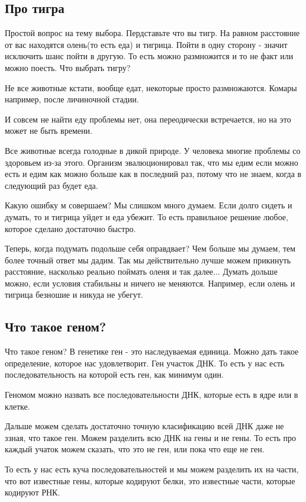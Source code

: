 ﻿\subsection{Про тигра}
Простой вопрос на тему выбора. 
Пердставьте что вы тигр. На равном расстояние от 
вас находятся олень(то есть еда) и тигрица. Пойти в одну 
сторону - значит исключить шанс пойти в другую. То есть 
можно размножится и то не факт или можно поесть. Что 
выбрать тигру? 

Не все животные кстати, вообще едат, некоторые просто размножаются. 
Комары например, после личиночной стадии. 

И совсем не найти еду проблемы нет, она переодически встречается, 
но на это может не быть времени. 

Все животные всегда голодные в дикой природе. У человека многие 
проблемы со здоровьем из-за этого. Организм эвалюционировал так, 
что мы едим если можно есть и едим как можно больше как в 
последний раз, потому что не знаем, когда в следующий раз будет еда. 

Какую ошибку м совершаем? Мы слишком много думаем. Если долго 
сидеть и думать, то и тигрица уйдет и еда убежит. То есть 
правильное решение любое, которое сделано достаточно быстро. 

Теперь, когда подумать подольше себя оправдвает? 
Чем больше мы думаем, тем более точный ответ мы дадим. 
Так мы действительно лучше можем прикинуть расстояние, 
насколько реально поймать оленя и так далее... Думать 
дольше можно, если условия стабильны и ничего не меняются. 
Например, если олень и тигрица безношие и никуда не убегут. 

\subsection{Что такое геном?}
Что такое геном? 
В генетике ген - это наследуваемая единица. Можно 
дать такое определение, которое нас удовлетворит. Ген 
участок ДНК. То есть у нас есть последовательность 
на которой есть ген, как минимум один. 

Геномом можно назвать все последовательности ДНК, которые есть 
в ядре или в клетке. 

Дальше можем сделать достаточно точную класификацию 
всей ДНК даже не ззная, что такое ген. Можем разделить 
всю ДНК на гены и не гены. То есть про каждый учаток можем сказать, 
что это не ген, или пока что еще не ген. 

То есть у нас есть куча последовательностей и мы можем разделить их 
на части, что вот известные гены, которые кодируют белки, 
это известные части, которые кодируют РНК. 

